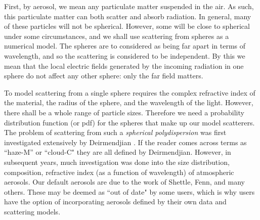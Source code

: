 \documentclass[12pt]{article}
\begin{document}
First, by aerosol, we mean any particulate matter suspended in the air. As such, this particulate matter can
both scatter and absorb radiation. In general, many of these particles will not be spherical. However, some will be
close to spherical 
under some circumstances, and we shall use scattering from spheres as a numerical model. The spheres are to
considered as being far apart in terms of wavelength, and so the scattering is considered to be independent. By
this we mean that the local electric fields generated by the incoming radiation in one sphere do not affect
any other sphere: only the far field matters.

To model scattering from a single sphere requires the complex refractive index of the material, the radius of
the sphere, and the wavelength of the light. However, there shall be a whole range of particle sizes. Therefore
we need a probability distribution function (or pdf) for the spheres that make up our model scatterers.
The problem of scattering from such a {\it spherical polydispersion} was first investigated extensively
by Deirmendjian \cite{Deirmendjian:Mybib}. If the reader comes across terms as ``haze-M'' or ``cloud-C" they are all defined by
Deirmendjian. However, in subsequent years, much investigation was done into the size distribution, composition, 
 refractive index (as a function of wavelength) of atmospheric aerosols.
Our default aerosols are due to the work of Shettle, Fenn, and many others. These may be deemed as ``out of date"
 by some users, which is why users have the option of incorporating aerosols defined
 by their own data and scattering models.
\end{document}
